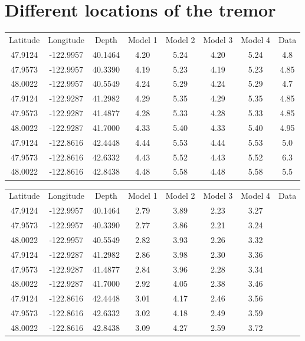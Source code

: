 \documentclass[workdone.tex]{subfiles}
\begin{document}
\section{Different locations of the tremor}

\begin{center}
\begin{tabular}{| c | c | c | c | c | c | c | c |}
  \hline
  Latitude & Longitude & Depth & Model 1 & Model 2 & Model 3 & Model 4 & Data \\
  47.9124 & -122.9957 & 40.1464 & 4.20 & 5.24 & 4.20 & 5.24 & 4.8 \\
  47.9573 & -122.9957 & 40.3390 & 4.19 & 5.23 & 4.19 & 5.23 & 4.85 \\
  48.0022 & -122.9957 & 40.5549 & 4.24 & 5.29 & 4.24 & 5.29 & 4.7 \\
  47.9124 & -122.9287 & 41.2982 & 4.29 & 5.35 & 4.29 & 5.35 & 4.85 \\
  47.9573 & -122.9287 & 41.4877 & 4.28 & 5.33 & 4.28 & 5.33 & 4.85 \\
  48.0022 & -122.9287 & 41.7000 & 4.33 & 5.40 & 4.33 & 5.40 & 4.95 \\
  47.9124 & -122.8616 & 42.4448 & 4.44 & 5.53 & 4.44 & 5.53 & 5.0 \\
  47.9573 & -122.8616 & 42.6332 & 4.43 & 5.52 & 4.43 & 5.52 & 6.3 \\
  48.0022 & -122.8616 & 42.8438 & 4.48 & 5.58 & 4.48 & 5.58 & 5.5 \\
  \hline
\end{tabular}
\captionsetup{type=table}
\end{center}

\begin{center}
\begin{tabular}{| c | c | c | c | c | c | c | c |}
  \hline
  Latitude & Longitude & Depth & Model 1 & Model 2 & Model 3 & Model 4 & Data \\
  47.9124 & -122.9957 & 40.1464 & 2.79 & 3.89 & 2.23 & 3.27 & \\
  47.9573 & -122.9957 & 40.3390 & 2.77 & 3.86 & 2.21 & 3.24 & \\
  48.0022 & -122.9957 & 40.5549 & 2.82 & 3.93 & 2.26 & 3.32 & \\
  47.9124 & -122.9287 & 41.2982 & 2.86 & 3.98 & 2.30 & 3.36 & \\
  47.9573 & -122.9287 & 41.4877 & 2.84 & 3.96 & 2.28 & 3.34 & \\
  48.0022 & -122.9287 & 41.7000 & 2.92 & 4.05 & 2.38 & 3.46 & \\
  47.9124 & -122.8616 & 42.4448 & 3.01 & 4.17 & 2.46 & 3.56 & \\
  47.9573 & -122.8616 & 42.6332 & 3.02 & 4.18 & 2.49 & 3.59 & \\
  48.0022 & -122.8616 & 42.8438 & 3.09 & 4.27 & 2.59 & 3.72 & \\
  \hline
\end{tabular}
\captionsetup{type=table}
\end{center}
\end{document}
